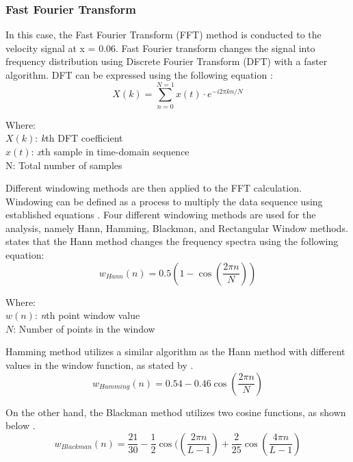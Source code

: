\documentclass[11pt]{article}
\begin{document}
\subsubsection{Fast Fourier Transform}
\label{sc: fft}
In this case, the Fast Fourier Transform (FFT) method is conducted to the velocity signal at x = 0.06. Fast Fourier transform changes the signal into frequency distribution using Discrete Fourier Transform (DFT) with a faster algorithm. DFT can be expressed using the following equation \citep{Roberts2021}:
\begin{equation}
    X(k) = \sum^{N=1}_{n=0} x(t)\cdot e^{-i2\pi kn/N}
\end{equation}
\begin{tabbing}
Where: \= \\
$X(k)$: \> \textit{k}th DFT coefficient\\
$x(t)$:\> \textit{x}th sample in time-domain sequence\\
N: \> Total number of samples
\end{tabbing}

\noindent Different windowing methods are then applied to the FFT calculation. Windowing can be defined as a process to multiply the data sequence using established equations \citep{VRU2023a}. Four different windowing methods are used for the analysis, namely Hann, Hamming, Blackman, and Rectangular Window methods. \citet{Oppenheim1999} states that the Hann method changes the frequency spectra using the following equation:
\begin{equation}
    w_{Hann}(n) = 0.5 \left(1-\cos{\left(\frac{2\pi n}{N}\right)}\right)
\end{equation}
\begin{tabbing}
Where: \= \\
$w(n)$: \> \textit{n}th point window value\\
$N$:\> Number of points in the window
\end{tabbing}

\noindent Hamming method utilizes a similar algorithm as the Hann method with different values in the window function, as stated by \citet{Oppenheim1999}.
\begin{equation}
    w_{Hamming}(n) = 0.54 - 0.46\cos{\left(\frac{2\pi n}{N}\right)}
\end{equation}

On the other hand, the Blackman method utilizes two cosine functions, as shown below \citep{Wolfram2023}.
\begin{equation}
    w_{Blackman}(n) = \frac{21}{30} - \frac12 \cos({\left(\frac{2\pi n}{L-1}\right)} + \frac{2}{25}\cos{\left(\frac{4\pi n}{L-1}\right)}
\end{equation}
\end{document}
